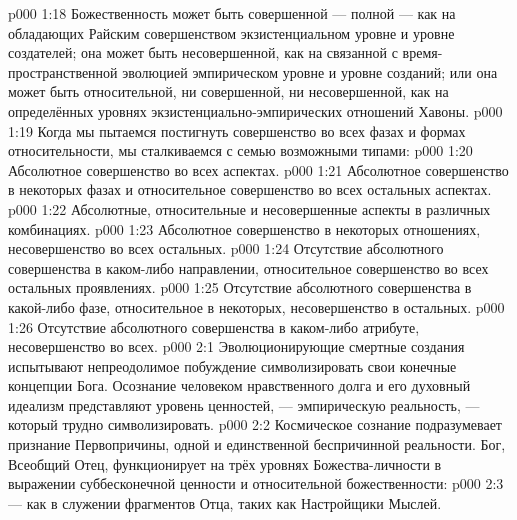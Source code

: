 \vs p000 1:18 Божественность может быть совершенной --- полной --- как на обладающих Райским совершенством экзистенциальном уровне и уровне создателей; она может быть несовершенной, как на связанной с время\hyp{}пространственной эволюцией эмпирическом уровне и уровне созданий; или она может быть относительной, ни совершенной, ни несовершенной, как на определённых уровнях экзистенциально\hyp{}эмпирических отношений Хавоны.
\vs p000 1:19 \pc Когда мы пытаемся постигнуть совершенство во всех фазах и формах относительности, мы сталкиваемся с семью возможными типами:
\vs p000 1:20 Абсолютное совершенство во всех аспектах.
\vs p000 1:21 Абсолютное совершенство в некоторых фазах и относительное совершенство во всех остальных аспектах.
\vs p000 1:22 Абсолютные, относительные и несовершенные аспекты в различных комбинациях.
\vs p000 1:23 Абсолютное совершенство в некоторых отношениях, несовершенство во всех остальных.
\vs p000 1:24 Отсутствие абсолютного совершенства в каком\hyp{}либо направлении, относительное совершенство во всех остальных проявлениях.
\vs p000 1:25 Отсутствие абсолютного совершенства в какой\hyp{}либо фазе, относительное в некоторых, несовершенство в остальных.
\vs p000 1:26 Отсутствие абсолютного совершенства в каком\hyp{}либо атрибуте, несовершенство во всех.
\vs p000 2:1 Эволюционирующие смертные создания испытывают непреодолимое побуждение символизировать свои конечные концепции Бога. Осознание человеком нравственного долга и его духовный идеализм представляют уровень ценностей, --- эмпирическую реальность, --- который трудно символизировать.
\vs p000 2:2 Космическое сознание подразумевает признание Первопричины, одной и единственной беспричинной реальности. Бог, Всеобщий Отец, функционирует на трёх уровнях Божества\hyp{}личности в выражении суббесконечной ценности и относительной божественности:
\vs p000 2:3  --- как в служении фрагментов Отца, таких как Настройщики Мыслей.
